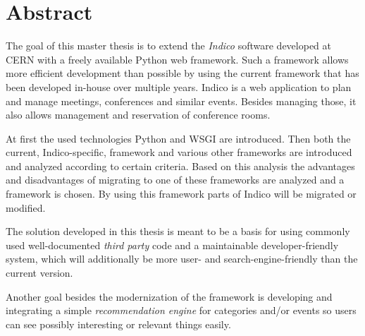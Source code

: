 \chapter*{Abstract}
\thispagestyle{empty}

The goal of this master thesis is to extend the \emph{Indico} software developed at CERN with a
freely available Python web framework. Such a framework allows more efficient development than
possible by using the current framework that has been developed in-house over multiple years.
Indico is a web application to plan and manage meetings, conferences and similar events. Besides
managing those, it also allows management and reservation of conference rooms.

At first the used technologies Python and WSGI are introduced. Then both the current,
Indico-specific, framework and various other frameworks are introduced and analyzed according to
certain criteria. Based on this analysis the advantages and disadvantages of migrating to one of
these frameworks are analyzed and a framework is chosen. By using this framework parts of Indico
will be migrated or modified.

The solution developed in this thesis is meant to be a basis for using commonly used well-documented
\emph{third party} code and a maintainable developer-friendly system, which will additionally be
more user- and search-engine-friendly than the current version.

Another goal besides the modernization of the framework is developing and integrating a simple
\emph{recommendation engine} for categories and/or events so users can see possibly interesting or
relevant things easily.
